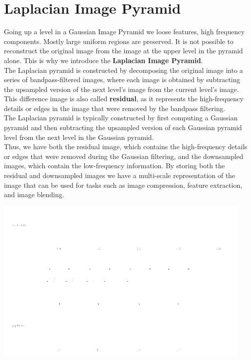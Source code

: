 \documentclass{article}
\begin{document}
\newpage

\section*{Laplacian Image Pyramid}

Going up a level in a Gaussian Image Pyramid we loose features, high frequency components. Mostly large uniform regions are preserved. It is not possible to reconstruct the original image from the image at the upper level in the pyramid alone. This is why we introduce the \textbf{Laplacian Image Pyramid}. \\

The Laplacian pyramid is constructed by decomposing the original image into a series of bandpass-filtered images, where each image is obtained by subtracting the upsampled version of the next level's image from the current level's image. This difference image is also called \textbf{residual}, as it represents the high-frequency details or edges in the image that were removed by the bandpass filtering. \\

The Laplacian pyramid is typically constructed by first computing a Gaussian pyramid and then subtracting the upsampled version of each Gaussian pyramid level from the next level in the Gaussian pyramid. \\

Thus, we have both the residual image, which contains the high-frequency details or edges that were removed during the Gaussian filtering, and the downsampled images, which contain the low-frequency information. By storing both the residual and downsampled images we have a multi-scale representation of the image that can be used for tasks such as image compression, feature extraction, and image blending.

\begin{center}
\includegraphics[width=0.95\textwidth]{images/pyramids.png}
\end{center}
\end{document}
